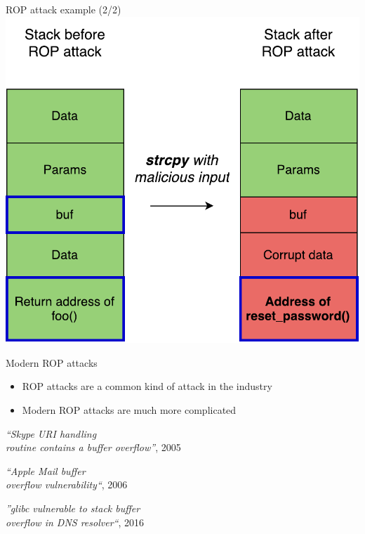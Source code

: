 \documentclass{beamer}
\begin{document}
\begin{frame}[c]{ROP attack example (2/2)}
	\center
	\vspace{-10mm}
	\includegraphics[height=0.7\textheight]{images/bof_stack.pdf}
\end{frame}

\begin{frame}[c]{Modern ROP attacks}
	\begin{itemize}
		\item ROP attacks are a common kind of attack in the industry
		\item Modern ROP attacks are much more complicated~\cite{BRSS08}
	\end{itemize}
	\hfill \break
	\begin{center}
		\textit{``Skype URI handling\\ routine contains a buffer overflow''}, 2005\footnotemark \\
	\end{center}
	\vspace{4mm}
	\textit{``Apple Mail buffer \\overflow vulnerability``}, 2006\\
	\begin{flushright}
		\textit{''glibc vulnerable to stack buffer \\overflow in DNS resolver``}, 2016
	\end{flushright}

\end{frame}
\end{document}
